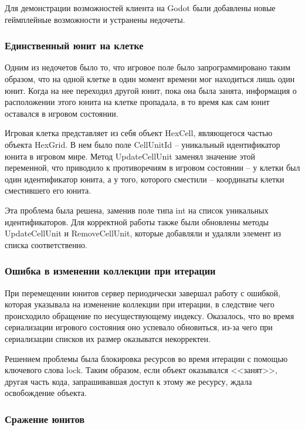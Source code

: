         Для демонстрации возможностей клиента на Godot были добавлены новые геймплейные возможности и устранены недочеты.

        \subsubsection{Единственный юнит на клетке}
        Одним из недочетов было то, что игровое поле было запрограммировано таким образом, что на одной клетке в один момент времени мог находиться лишь один юнит. Когда на нее переходил другой юнит, пока она была занята, информация о расположении этого юнита на клетке пропадала, в то время как сам юнит оставался в игровом состоянии.

        Игровая клетка представляет из себя объект HexCell, являющегося частью объекта HexGrid. В нем было поле CellUnitId -- уникальный идентификатор юнита в игровом мире. Метод UpdateCellUnit заменял значение этой переменной, что приводило к противоречиям в игровом состоянии -- у клетки был один идентификатор юнита, а у того, которого сместили -- координаты клетки сместившего его юнита.

        Эта проблема была решена, заменив поле типа int на список уникальных идентификаторов. Для корректной работы также были обновлены методы UpdateCellUnit и RemoveCellUnit, которые добавляли и удаляли элемент из списка соответственно.

        \subsubsection{Ошибка в изменении коллекции при итерации}

        При перемещении юнитов сервер периодически завершал работу с ошибкой, которая указывала на изменение коллекции при итерации, в следствие чего происходило обращение по несуществующему индексу. Оказалось, что во время сериализации игрового состояния оно успевало обновиться, из-за чего при сериализации списков их размер оказыватся некорректен.

        Решением проблемы была блокировка ресурсов во время итерации с помощью ключевого слова lock. Таким образом, если объект оказывался <<занят>>, другая часть кода, запрашивавшая доступ к этому же ресурсу, ждала освобождение объекта.

        \subsubsection{Сражение юнитов}

